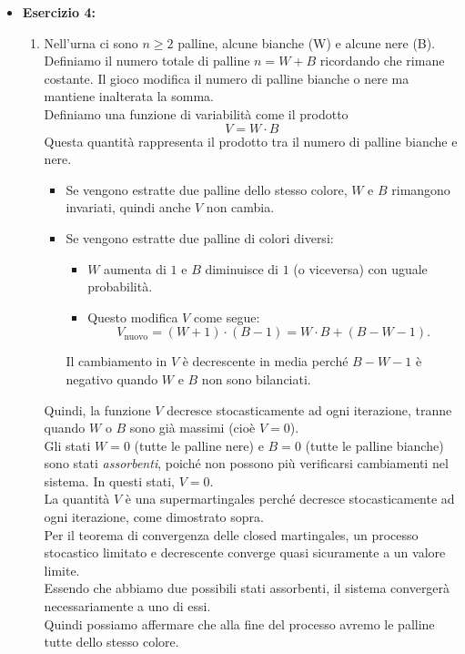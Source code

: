 \documentclass[a4paper,12pt]{article}
\begin{document}
\begin{itemize}
\begin{enumerate} [label=\alph*)]
		\end{enumerate}
		\newpage
		\item \textbf{Esercizio 4: }
		\begin{enumerate} [label=\alph*)]
			\item Nell'urna ci sono $n \geq 2$ palline, alcune bianche (W) e alcune nere (B). Definiamo il numero totale di palline $n=W+B$ ricordando che rimane costante. Il gioco modifica il numero di palline bianche o nere ma mantiene inalterata la somma.\\
			Definiamo una funzione di variabilità come il prodotto
			\[ V= W \cdot B\]
			Questa quantità rappresenta il prodotto tra il numero di palline bianche e nere.
			\begin{itemize}
				\item {} Se vengono estratte due palline dello stesso colore, $W$ e $B$ rimangono invariati, quindi anche $V$ non cambia.
				\item {} Se vengono estratte due palline di colori diversi:
				\begin{itemize}
					\item $W$ aumenta di $1$ e $B$ diminuisce di $1$ (o viceversa) con uguale probabilità.
					\item Questo modifica $V$ come segue:
					$$
					V_{\text{nuovo}} = (W + 1) \cdot (B - 1) = W \cdot B + (B - W - 1).
					$$
				\end{itemize}
				Il cambiamento in $V$ è decrescente in media perché $B - W - 1$ è negativo quando $W$ e $B$ non sono bilanciati.
			\end{itemize}
			
			Quindi, la funzione $V$ decresce stocasticamente ad ogni iterazione, tranne quando $W$ o $B$ sono già massimi (cioè $V = 0$).\\
			\newline
			Gli stati $W = 0$ (tutte le palline nere) e $B = 0$ (tutte le palline bianche) sono stati \textit{assorbenti}, poiché non possono più verificarsi cambiamenti nel sistema. In questi stati, $V = 0$.\\
			\newline
			La quantità $V$ è una supermartingales perché decresce stocasticamente ad ogni iterazione, come dimostrato sopra.\\
			Per il teorema di convergenza delle closed martingales, un processo stocastico limitato e decrescente converge quasi sicuramente a un valore limite.\\
			Essendo che abbiamo due possibili stati assorbenti, il sistema convergerà necessariamente a uno di essi. \\
			Quindi possiamo affermare che alla fine del processo avremo le palline tutte dello stesso colore.
			

\end{enumerate}
\end{itemize}
\end{document}
